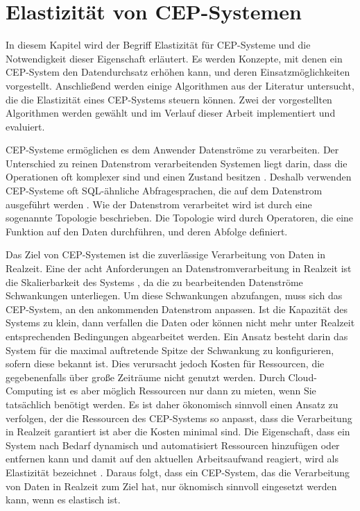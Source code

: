 \chapter{Elastizität von CEP-Systemen}

In diesem Kapitel wird der Begriff Elastizität für CEP-Systeme und die Notwendigkeit dieser Eigenschaft erläutert.
Es werden Konzepte, mit denen ein CEP-System den Datendurchsatz erhöhen kann, und deren Einsatzmöglichkeiten vorgestellt.
Anschließend werden einige Algorithmen aus der Literatur untersucht, die die Elastizität eines CEP-Systems steuern können.
Zwei der vorgestellten Algorithmen werden gewählt und im Verlauf dieser Arbeit implementiert und evaluiert.

CEP-Systeme ermöglichen es dem Anwender Datenströme zu verarbeiten.
Der Unterschied zu reinen Datenstrom verarbeitenden Systemen liegt darin, dass die Operationen oft komplexer sind und einen Zustand besitzen  \cite{carbone_towards_2013}.
Deshalb verwenden CEP-Systeme oft SQL-ähnliche Abfragesprachen, die auf dem Datenstrom ausgeführt werden \cite{carbone_towards_2013}.
Wie der Datenstrom verarbeitet wird ist durch eine sogenannte Topologie beschrieben.
Die Topologie wird durch Operatoren, die eine Funktion auf den Daten durchführen, und deren Abfolge definiert.

Das Ziel von CEP-Systemen ist die zuverlässige Verarbeitung von Daten in Realzeit.
Eine der acht Anforderungen an Datenstromverarbeitung in Realzeit ist die Skalierbarkeit des Systems \cite{stonebraker_8_2005}, da die zu bearbeitenden Datenströme Schwankungen unterliegen.
Um diese Schwankungen abzufangen, muss sich das CEP-System, an den ankommenden Datenstrom anpassen.
Ist die Kapazität des Systems zu klein, dann verfallen die Daten oder können nicht mehr unter Realzeit entsprechenden Bedingungen abgearbeitet werden.
Ein Ansatz besteht darin das System für die maximal auftretende Spitze der Schwankung zu konfigurieren, sofern diese bekannt ist.
Dies verursacht jedoch Kosten für Ressourcen, die gegebenenfalls über große Zeiträume nicht genutzt werden.
Durch Cloud-Computing ist es aber möglich Ressourcen nur dann zu mieten, wenn Sie tatsächlich benötigt werden.
Es ist daher ökonomisch sinnvoll einen Ansatz zu verfolgen, der die Ressourcen des CEP-Systems so anpasst, dass die Verarbeitung in Realzeit garantiert ist aber die Kosten minimal sind.
Die Eigenschaft, dass ein System nach Bedarf dynamisch und automatisiert Ressourcen hinzufügen oder entfernen kann und damit auf den aktuellen Arbeitsaufwand reagiert, wird als Elastizität bezeichnet \cite{herbst_elasticity_nodate}.
Daraus folgt, dass ein CEP-System, das die Verarbeitung von Daten in Realzeit zum Ziel hat, nur öknomisch sinnvoll eingesetzt werden kann, wenn es elastisch ist.

